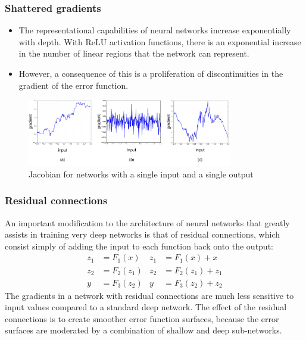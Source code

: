 \documentclass{beamer}
\begin{document}
\begin{frame}
    \frametitle{Shattered gradients}
    \begin{itemize}
        \item The representational capabilities of neural networks increase exponentially with depth. With $\mathrm{ReLU}$ activation functions, there is an exponential increase in the number of linear regions that the network can represent.
        \item However, a consequence of this is a proliferation of discontinuities in the gradient of the error function.
    \end{itemize}
    \begin{figure}
        \caption{Jacobian for networks with a single input and a single output}
        \includegraphics[width=0.8\textwidth]{Figure_12.pdf}
    \end{figure}
\end{frame}

\begin{frame}
    \frametitle{Residual connections}
    An important modification to the architecture of neural networks that greatly assists in training very deep networks is that of residual connections, which consist simply of adding the input to each function back onto the output:
    \begin{align*}
        z_{1}&=F_{1}(x)&z_{1}&=F_{1}(x)+x \\
        z_{2}&=F_{2}(z_{1})&z_{2}&=F_{2}(z_{1})+z_{1} \\
        y&=F_{3}(z_{2})&y&=F_{3}(z_{2})+z_{2}
    \end{align*}
    The gradients in a network with residual connections are much less sensitive to input values compared to a standard deep network. The effect of the residual connections is to create smoother error function surfaces, because the error surfaces are moderated by a combination of shallow and deep sub-networks.
\end{frame}
\end{document}
